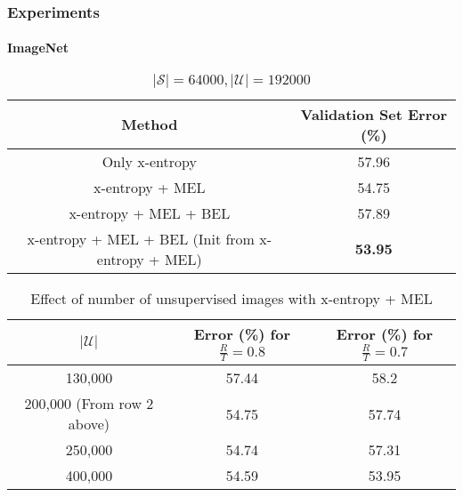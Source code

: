\begin{frame}
	\frametitle{Experiments}
	\framesubtitle{ImageNet}
	\begin{table}
		\centering
		\resizebox{\textwidth}{!}
		{
		\begin{tabular}{|c|c|}
			\hline
			\textbf{Method} & Validation Set Error (\%)\\
			\hline
			Only x-entropy & 57.96\\
			x-entropy + MEL & 54.75\\
			x-entropy + MEL + BEL & 57.89\\
			x-entropy + MEL + BEL (Init from x-entropy + MEL) & \textbf{53.95}\\
			\hline
		\end{tabular}
		}
		\vspace{-8pt}
		\caption{\tiny{$|\mathcal{S}| = 64000, |\mathcal{U}| = 192000$}}
	\end{table}
	\vspace{-20pt}
	\begin{table}
		\centering
		\resizebox{\textwidth}{!}
		{
		\begin{tabular}{|c|c|c|}
			\hline
			$|\mathcal{U}|$ & Error (\%) for $\frac{R}{T} = 0.8$ & Error (\%) for $\frac{R}{T}=0.7$\\
			\hline
			130,000 & 57.44 & 58.2\\
			200,000 (From row 2 above) & 54.75 & 57.74\\
			250,000 & 54.74 & 57.31\\
			400,000 & 54.59 & 53.95\\
			\hline
		\end{tabular}
	}
		\caption{\tiny{Effect of number of unsupervised images with x-entropy + MEL}}
	\end{table}
\end{frame}


